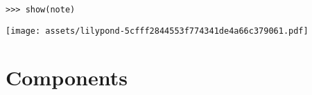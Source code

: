 \begin{comment}
<abjad>
show(note)
</abjad>
\end{comment}

\begin{abjadbookoutput}
\begin{singlespacing}
\vspace{-0.5\baselineskip}
\begin{lstlisting}
>>> show(note)
\end{lstlisting}
\noindent\texttt{[image: assets/lilypond-5cfff2844553f774341de4a66c379061.pdf]}
\end{singlespacing}
\end{abjadbookoutput}

\section{Components}

\begin{comment}
-   Every component may be named.
-   components, leaves, containers (and contexts)
-   components are formattable and illustrable
-   components are mutable, while indicators are generally not
    -   likewise, durations and pitches are immutable

-   count-time components
    -   note, chord, rest, skip, container, tuplet, measure
-   non-count-time (contexts)
    -   voice, staff, staff group, score

-   leaves do not contain anything else
    -   chord do *not* contain notes
    -   chords and notes contain note heads
    -   chord and notes share a single stem
    -   this must be disambiguated from note columns

-   all containers derive their duration from their contents (with some
    exceptions, but even there a mismatch is an error)
-   written duration, prolated duration, pre-prolated duration, contents
    duration

-   One, and only one, parent per component. They *cannot* be in more than one
    container. This is both confusing, and liable to cause reference problems.
-   score hierarchy is not fixed: any node is the root, if it has no parent

-   contexts are assumed to last from the beginning to the end of the total
    timespan of the score, but in practice they may be intermittent
-   contexts may be named, allowing concatenation

-   Leaves reside at the "bottom" of the score hierarchy.

Work aspects of this into appropriate sections

-   inspect_()
-   not *inspect()*, as that would cause a name conflict with Python's inspect
    module
-   inspect(...).get_parentage()
-   inspect_(...).get_duration()
    -   in_seconds=True
-   inspect_(...).get_timespan()
    -   in_seconds=True
\end{comment}

